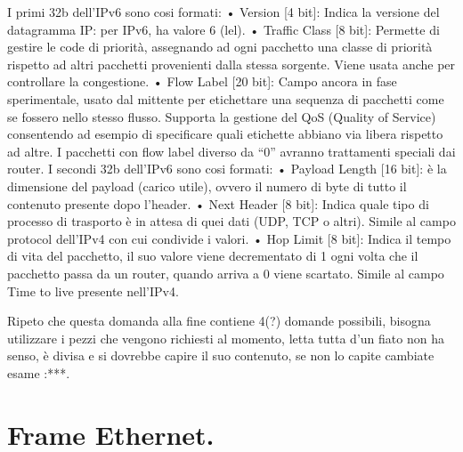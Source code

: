  

I primi 32b dell’IPv6 sono cosi formati:
•	Version [4 bit]: Indica la versione del datagramma IP: per IPv6, ha valore 6 (lel).
•	Traffic Class [8 bit]: Permette di gestire le code di priorità, assegnando ad ogni pacchetto una classe di priorità rispetto ad altri pacchetti provenienti dalla stessa sorgente. Viene usata anche per controllare la congestione.
•	Flow Label [20 bit]: Campo ancora in fase sperimentale, usato dal mittente per etichettare una sequenza di pacchetti come se fossero nello stesso flusso. Supporta la gestione del QoS (Quality of Service) consentendo ad esempio di specificare quali etichette abbiano via libera rispetto ad altre. I pacchetti con flow label diverso da “0” avranno trattamenti speciali dai router.
I secondi 32b dell’IPv6 sono cosi formati:
•	Payload Length [16 bit]: è la dimensione del payload (carico utile), ovvero il numero di byte di tutto il contenuto presente dopo l’header.
•	Next Header [8 bit]: Indica quale tipo di processo di trasporto è in attesa di quei dati (UDP, TCP o altri). Simile al campo protocol dell’IPv4 con cui condivide i valori.
•	Hop Limit [8 bit]: Indica il tempo di vita del pacchetto, il suo valore viene decrementato di 1 ogni volta che il pacchetto passa da un router, quando arriva a 0 viene scartato. Simile al campo Time to live presente nell’IPv4.

 
Ripeto che questa domanda alla fine contiene 4(?) domande possibili, bisogna utilizzare i pezzi che vengono richiesti al momento, letta tutta d’un fiato non ha senso, è divisa e si dovrebbe capire il suo contenuto, se non lo capite cambiate esame :***.
\section{Frame Ethernet.}

